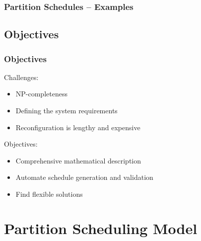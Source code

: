 \documentclass[english, frametitlelogo, mainlogoleft, handout]{beamer}
\begin{document}
\begin{frame}
    \frametitle{Partition Schedules -- Examples}
    \centering
    \resizebox{0.9\linewidth}{!}{}

    \vspace{1cm}
    \centering
    \resizebox{0.9\linewidth}{!}{}
\end{frame}

\subsection{Objectives}

\begin{frame}
    \frametitle{Objectives}

    Challenges:
    \vspace{5pt}
    \begin{itemize}
        \item<1-> NP-completeness
        \item<2-> Defining the system requirements
        \item<3-> Reconfiguration is lengthy and expensive
    \end{itemize}

    \vspace{20pt}

    Objectives:
    \vspace{5pt}
    \begin{itemize}
        \item<4-> Comprehensive mathematical description
        \item<5-> Automate schedule generation and validation
        \item<6-> Find flexible solutions
    \end{itemize}

\end{frame}

\section{Partition Scheduling Model}
\end{document}
